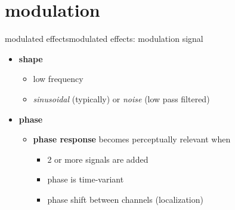     \section{modulation}
		\begin{frame}{modulated effects}{modulated effects: modulation signal}
			\begin{itemize}
				\item	\textbf{shape}
					\begin{itemize}
						\item	low frequency 
						\item	\textit{sinusoidal} (typically) or \textit{noise} (low pass filtered)
						
					\end{itemize}
				\pause
				\bigskip
				\item	\textbf{phase}
					\begin{itemize}
						\item	\textbf{phase response} becomes perceptually relevant when
							\begin{itemize}
								\item   2 or more signals are added
								\item   phase is time-variant
								\item   phase shift between channels (localization)
							\end{itemize}
					\end{itemize}
			\end{itemize}
		\end{frame}


